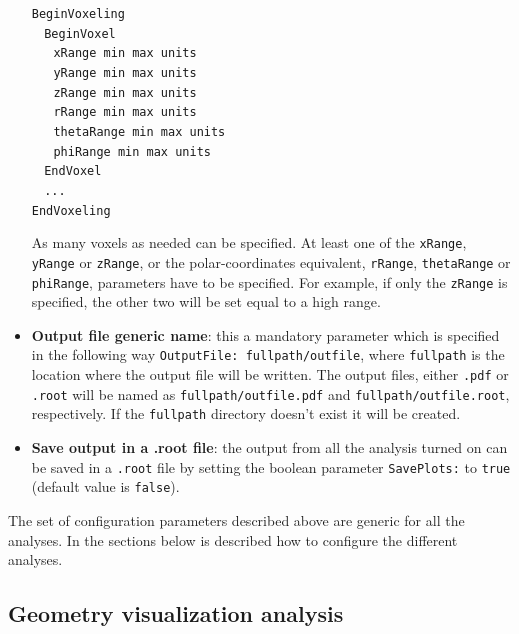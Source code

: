 \begin{itemize}
 \noindent
 {\tt BeginVoxeling} \\
 $~~~~${\tt BeginVoxel} \\
 $~~~~~~~${\tt xRange       min  max units} \\
 $~~~~~~~${\tt yRange       min  max units} \\
 $~~~~~~~${\tt zRange       min  max units} \\
 $~~~~~~~${\tt rRange       min  max units} \\
 $~~~~~~~${\tt thetaRange   min  max units} \\
 $~~~~~~~${\tt phiRange     min  max units} \\
 $~~~~${\tt EndVoxel} \\
 $~~~~${\tt ...} \\
 {\tt EndVoxeling}
 
 \noindent
 As many voxels as needed can be specified. At least one of the {\tt xRange}, {\tt yRange} or {\tt zRange}, or the polar-coordinates equivalent, {\tt rRange}, {\tt thetaRange} or {\tt phiRange}, 
 parameters have to be specified. For example, if only the {\tt zRange} is specified, the other two will be set equal to a high range.
 
 \item {\bf Output file generic name}: this a mandatory parameter which is specified in the following  way {\tt OutputFile: fullpath/outfile}, where {\tt fullpath} is the location where the output file will be 
 written. The output files, either {\tt .pdf} or {\tt .root} will be named as {\tt fullpath/outfile.pdf} and {\tt fullpath/outfile.root}, respectively. If the {\tt fullpath} directory doesn't exist 
 it will be created.
 
 \item {\bf Save output in a .root file}: the output from all the analysis turned on can be saved in a {\tt .root} file by setting the boolean parameter {\tt SavePlots:} to {\tt true} (default value 
 is {\tt false}).
 
\end{itemize}

The set of configuration parameters described above are generic for all the analyses. In the sections below is described how to configure the different analyses.

\subsection{Geometry visualization analysis}
\label{subsec:GeoVisual_analysis}

